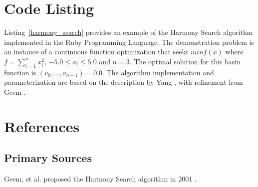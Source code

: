 \documentclass[a4paper, 11pt]{article}
\begin{document}
\section{Code Listing}
\label{sec:code}
Listing~\ref{harmony_search} provides an example of the Harmony Search algorithm implemented in the Ruby Programming Language. 
The demonstration problem is an instance of a continuous function optimization that seeks $min f(x)$ where $f=\sum_{i=1}^n x_{i}^2$, $-5.0\leq x_i \leq 5.0$ and $n=3$. The optimal solution for this basin function is $(v_0,\ldots,v_{n-1})=0.0$.
The algorithm implementation and parameterization are based on the description by Yang \cite{Yang2009}, with refinement from Geem \cite{Geem2010a}.



\section{References}
\label{sec:references}

% 
% 
\subsection{Primary Sources}
Geem, et al. proposed the Harmony Search algorithm in 2001 \cite{Geem2001}.
\end{document}
